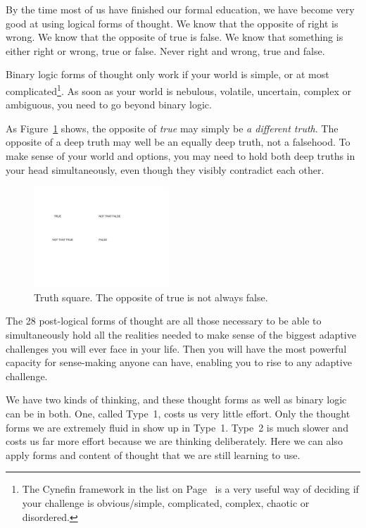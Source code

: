 By the time most of us have finished our formal education, we have become very good at using logical forms of thought. We know that the opposite of right is wrong. We know that the opposite of true is false. We know that something is either right or wrong, true or false. Never right and wrong, true and false.


Binary logic forms of thought only work if your world is simple, or at most complicated\footnote{The Cynefin framework in the list on Page~\pageref{list:cynefin} is a very useful way of deciding if your challenge is obvious/simple, complicated, complex, chaotic or disordered\cite{snowden-cynefin, cynefin}.}. As soon as your world is nebulous, volatile, uncertain, complex or ambiguous, you need to go beyond binary logic.


As Figure~\ref{figure:truth-square} shows, the opposite of \emph{true} may simply be \emph{a different truth}. The opposite of a deep truth may well be an equally deep truth, not a falsehood. To make sense of your world and options, you may need to hold both deep truths in your head simultaneously, even though they visibly contradict each other.


\begin{figure}
\includegraphics[width=0.45\textwidth]{./Images/truth-square}
\caption{Truth square. The opposite of true is not always false.}
\label{figure:truth-square}
\end{figure}


The 28 post-logical forms of thought are all those necessary to be able to simultaneously hold all the realities needed to make sense of the biggest adaptive challenges you will ever face in your life. Then you will have the most powerful capacity for sense-making anyone can have, enabling you to rise to any adaptive challenge.


We have two kinds of thinking, and these thought forms as well as binary logic can be in both. One, called Type~1, costs us very little effort. Only the thought forms we are extremely fluid in show up in Type~1. Type~2 is much slower and costs us far more effort because we are thinking deliberately. Here we can also apply forms and content of thought that we are still learning to use. 


